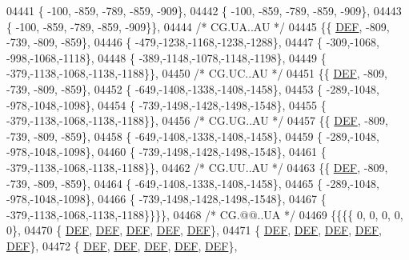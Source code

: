 \begin{DoxyCode}
04441 \{ -100, -859, -789, -859, -909\},
04442 \{ -100, -859, -789, -859, -909\},
04443 \{ -100, -859, -789, -859, -909\}\},
04444 \textcolor{comment}{/* CG.UA..AU */}
04445 \{\{  \mbox{\hyperlink{1_88_84__epars_8h_a397419fc12b37ed479c8abb9d444d843}{DEF}}, -809, -739, -809, -859\},
04446 \{ -479,-1238,-1168,-1238,-1288\},
04447 \{ -309,-1068, -998,-1068,-1118\},
04448 \{ -389,-1148,-1078,-1148,-1198\},
04449 \{ -379,-1138,-1068,-1138,-1188\}\},
04450 \textcolor{comment}{/* CG.UC..AU */}
04451 \{\{  \mbox{\hyperlink{1_88_84__epars_8h_a397419fc12b37ed479c8abb9d444d843}{DEF}}, -809, -739, -809, -859\},
04452 \{ -649,-1408,-1338,-1408,-1458\},
04453 \{ -289,-1048, -978,-1048,-1098\},
04454 \{ -739,-1498,-1428,-1498,-1548\},
04455 \{ -379,-1138,-1068,-1138,-1188\}\},
04456 \textcolor{comment}{/* CG.UG..AU */}
04457 \{\{  \mbox{\hyperlink{1_88_84__epars_8h_a397419fc12b37ed479c8abb9d444d843}{DEF}}, -809, -739, -809, -859\},
04458 \{ -649,-1408,-1338,-1408,-1458\},
04459 \{ -289,-1048, -978,-1048,-1098\},
04460 \{ -739,-1498,-1428,-1498,-1548\},
04461 \{ -379,-1138,-1068,-1138,-1188\}\},
04462 \textcolor{comment}{/* CG.UU..AU */}
04463 \{\{  \mbox{\hyperlink{1_88_84__epars_8h_a397419fc12b37ed479c8abb9d444d843}{DEF}}, -809, -739, -809, -859\},
04464 \{ -649,-1408,-1338,-1408,-1458\},
04465 \{ -289,-1048, -978,-1048,-1098\},
04466 \{ -739,-1498,-1428,-1498,-1548\},
04467 \{ -379,-1138,-1068,-1138,-1188\}\}\}\},
04468 \textcolor{comment}{/* CG.@@..UA */}
04469 \{\{\{\{    0,    0,    0,    0,    0\},
04470 \{  \mbox{\hyperlink{1_88_84__epars_8h_a397419fc12b37ed479c8abb9d444d843}{DEF}},  \mbox{\hyperlink{1_88_84__epars_8h_a397419fc12b37ed479c8abb9d444d843}{DEF}},  \mbox{\hyperlink{1_88_84__epars_8h_a397419fc12b37ed479c8abb9d444d843}{DEF}},  \mbox{\hyperlink{1_88_84__epars_8h_a397419fc12b37ed479c8abb9d444d843}{DEF}},  \mbox{\hyperlink{1_88_84__epars_8h_a397419fc12b37ed479c8abb9d444d843}{DEF}}\},
04471 \{  \mbox{\hyperlink{1_88_84__epars_8h_a397419fc12b37ed479c8abb9d444d843}{DEF}},  \mbox{\hyperlink{1_88_84__epars_8h_a397419fc12b37ed479c8abb9d444d843}{DEF}},  \mbox{\hyperlink{1_88_84__epars_8h_a397419fc12b37ed479c8abb9d444d843}{DEF}},  \mbox{\hyperlink{1_88_84__epars_8h_a397419fc12b37ed479c8abb9d444d843}{DEF}},  \mbox{\hyperlink{1_88_84__epars_8h_a397419fc12b37ed479c8abb9d444d843}{DEF}}\},
04472 \{  \mbox{\hyperlink{1_88_84__epars_8h_a397419fc12b37ed479c8abb9d444d843}{DEF}},  \mbox{\hyperlink{1_88_84__epars_8h_a397419fc12b37ed479c8abb9d444d843}{DEF}},  \mbox{\hyperlink{1_88_84__epars_8h_a397419fc12b37ed479c8abb9d444d843}{DEF}},  \mbox{\hyperlink{1_88_84__epars_8h_a397419fc12b37ed479c8abb9d444d843}{DEF}},  \mbox{\hyperlink{1_88_84__epars_8h_a397419fc12b37ed479c8abb9d444d843}{DEF}}\},

\end{DoxyCode}
